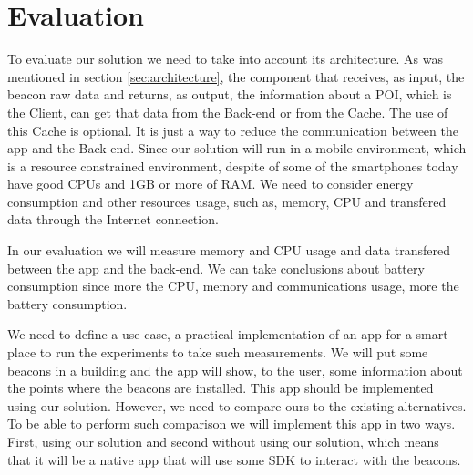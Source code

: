 
% 
% 

\section{Evaluation}
\label{sec:evaluation}


To evaluate our solution we need to take into account its
architecture. As was mentioned in section \ref{sec:architecture},
the component that receives, as input, the beacon raw data and
returns, as output, the information about a POI, which is the
Client, can get that data from the Back-end or from the Cache.
The use of this Cache is optional. It is just a way to reduce
the communication between the app and the Back-end.
Since our solution will run in a mobile environment, 
which is a resource constrained environment,
despite of some of the smartphones today have
good CPUs and 1GB or more of RAM.
We need to consider energy consumption and other resources
usage, such as, memory, CPU and transfered data through the
Internet connection.

In our evaluation we will measure memory and CPU usage
and data transfered between the app and the back-end.
We can take conclusions about battery consumption since
more the CPU, memory and communications usage,
more the battery consumption.

We need to define a use case, a practical implementation
of an app for a smart place to run the experiments
to take such measurements. We will put some beacons
in a building and the app will show, to the user,
some information about the points where the beacons
are installed.
This app should be implemented using our solution.
However, we need to compare ours to the existing
alternatives. To be able to perform such comparison
we will implement this app in two ways.
First, using our solution and second without using
our solution, which means that it will be a native
app that will use some SDK to interact with the
beacons.

